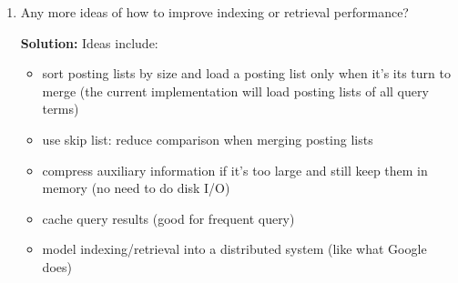 \documentclass{article}
\newcommand{\tmtextbf}[1]{{\bfseries{#1}}}
\newcommand{\tmtt}[1]{\texttt{#1}}
\newenvironment{enumeratealpha}{\begin{enumerate}[a{\textup{)}}] }{\end{enumerate}}
\begin{document}
\begin{enumeratealpha}
\begin{itemize}
    \item choose proper block size according to a)
    
    \item cache auxiliary information (e.g. {\tmtt{termDict}}) to reduce
    memory usage
    
    \item load posting list in a buffered way instead of loading the whole
    list
  \end{itemize}
  \item Any more ideas of how to improve indexing or retrieval performance?
  
  \tmtextbf{Solution:} Ideas include:
  \begin{itemize}
    \item sort posting lists by size and load a posting list only when it's
    its turn to merge (the current implementation will load posting lists of
    all query terms)
    
    \item use skip list: reduce comparison when merging posting lists
    
    \item compress auxiliary information if it's too large and still keep them
    in memory (no need to do disk I/O)
    
    \item cache query results (good for frequent query)
    
    \item model indexing/retrieval into a distributed system (like what Google
    does)
  \end{itemize}
\end{enumeratealpha}
\end{document}
